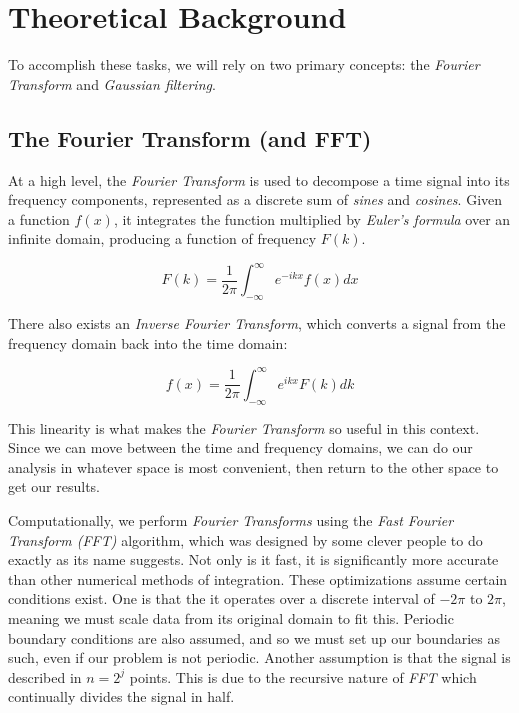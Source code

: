\documentclass[11pt]{article}
\begin{document}
    \hypertarget{theoretical-background}{%
\section{Theoretical Background}\label{theoretical-background}}

To accomplish these tasks, we will rely on two primary concepts: the
\emph{Fourier Transform} and \emph{Gaussian filtering}.

\hypertarget{the-fourier-transform-and-fft}{%
\subsection{The Fourier Transform (and
FFT)}\label{the-fourier-transform-and-fft}}

At a high level, the \emph{Fourier Transform} is used to decompose a
time signal into its frequency components, represented as a discrete sum
of \emph{sines} and \emph{cosines}. Given a function \(f(x)\), it
integrates the function multiplied by \emph{Euler's formula} over an
infinite domain, producing a function of frequency \(F(k)\).

\[F(k) = \frac{1}{2\pi} \int_{-\infty}^{\infty} e^{-ikx}f(x) dx\]

There also exists an \emph{Inverse Fourier Transform}, which converts a
signal from the frequency domain back into the time domain:

\[f(x) = \frac{1}{2\pi} \int_{-\infty}^{\infty} e^{ikx}F(k) dk\]

This linearity is what makes the \emph{Fourier Transform} so useful in
this context. Since we can move between the time and frequency domains,
we can do our analysis in whatever space is most convenient, then return
to the other space to get our results.

Computationally, we perform \emph{Fourier Transforms} using the
\emph{Fast Fourier Transform (FFT)} algorithm, which was designed by
some clever people to do exactly as its name suggests. Not only is it
fast, it is significantly more accurate than other numerical methods of
integration. These optimizations assume certain conditions exist. One is
that the it operates over a discrete interval of \(-2\pi\) to \(2\pi\),
meaning we must scale data from its original domain to fit this.
Periodic boundary conditions are also assumed, and so we must set up our
boundaries as such, even if our problem is not periodic. Another
assumption is that the signal is described in \(n = 2^{j}\) points. This
is due to the recursive nature of \emph{FFT} which continually divides
the signal in half.
\end{document}
